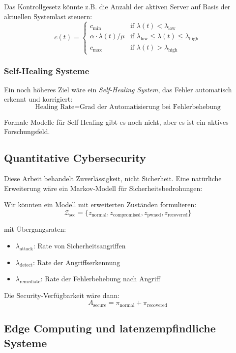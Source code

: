 \documentclass[a4paper,11pt]{article}
\theoremstyle{definition}
\begin{document}
Das Kontrollgesetz könnte z.B. die Anzahl der aktiven Server auf Basis der aktuellen 
Systemlast steuern:
\[
    c(t) = \begin{cases}
        c_{\min} & \text{if } \lambda(t) < \lambda_{\text{low}} \\
        \alpha \cdot \lambda(t) / \mu & \text{if } \lambda_{\text{low}} \leq \lambda(t) \leq \lambda_{\text{high}} \\
        c_{\max} & \text{if } \lambda(t) > \lambda_{\text{high}}
    \end{cases}
\]

\subsubsection{Self-Healing Systeme}

Ein noch höheres Ziel wäre ein \emph{Self-Healing System}, das Fehler automatisch erkennt und 
korrigiert:
\[
    \text{Healing Rate} = \text{Grad der Automatisierung bei Fehlerbehebung}
\]

Formale Modelle für Self-Healing gibt es noch nicht, aber es ist ein aktives Forschungsfeld.

\subsection{Quantitative Cybersecurity}

Diese Arbeit behandelt Zuverlässigkeit, nicht Sicherheit. Eine natürliche Erweiterung 
wäre ein Markov-Modell für Sicherheitsbedrohungen:

Wir könnten ein Modell mit erweiterten Zuständen formulieren:
\[
    \mathcal{Z}_{\text{sec}} = \{z_{\text{normal}}, z_{\text{compromised}}, z_{\text{pwned}}, z_{\text{recovered}}\}
\]

mit Übergangsraten:
\begin{itemize}
    \item $\lambda_{\text{attack}}$: Rate von Sicherheitsangriffen
    \item $\lambda_{\text{detect}}$: Rate der Angriffserkennung
    \item $\lambda_{\text{remediate}}$: Rate der Fehlerbehebung nach Angriff
\end{itemize}

Die Security-Verfügbarkeit wäre dann:
\[
    A_{\text{secure}} = \pi_{\text{normal}} + \pi_{\text{recovered}}
\]

\subsection{Edge Computing und latenzempfindliche Systeme}
\end{document}
